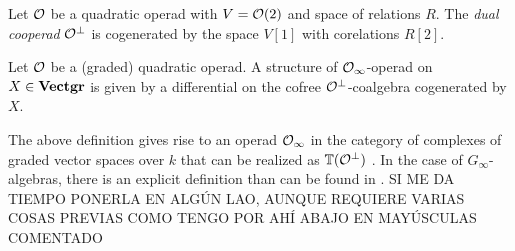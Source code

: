 \documentclass[TFM.tex]{subfiles}
\begin{document}
\begin{defi}
Let ${\mathcal O}$ be a quadratic operad with $V={\mathcal O}(2)$ and space of relations $R$. The \emph{dual cooperad} ${\mathcal O}^{\perp}$ is cogenerated by the space $V[1]$ with corelations $R[2]$.
\end{defi}


\begin{defi}
Let ${\mathcal O}$ be a (graded) quadratic operad. A structure of ${\mathcal O}_\infty$-operad on $X\in\mathrm{\mathbf{Vectgr}}$ is given by a differential on the cofree ${\mathcal O}^\perp$-coalgebra cogenerated by $X$.
\end{defi}

The above definition gives rise to an operad ${\mathcal O}_\infty$ in the category of complexes of graded vector spaces over $k$ that can be realized as $\mathbb{T}({\mathcal O}^\perp)$ \cite{Hinich}. In the case of $G_\infty$-algebras, there is an explicit definition than can be found in \cite[Proposition 16]{Galvez}. SI ME DA TIEMPO PONERLA EN ALGÚN LAO, AUNQUE REQUIERE VARIAS COSAS PREVIAS COMO TENGO POR AHÍ ABAJO EN MAYÚSCULAS COMENTADO
\end{document}
